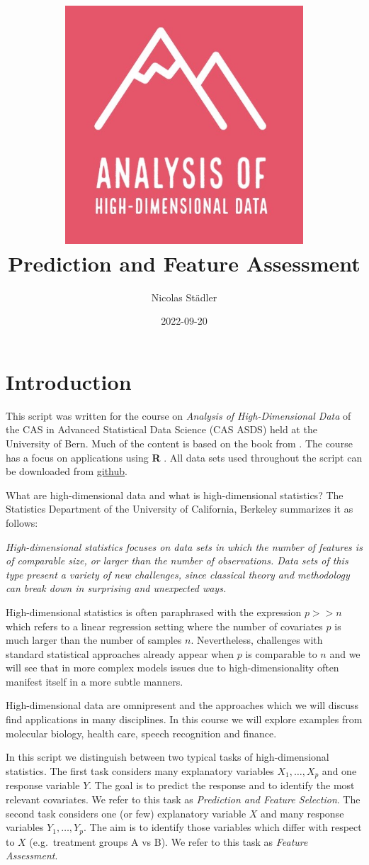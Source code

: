 \documentclass[
]{book}
\title{\includegraphics[width=3.5in,height=\textheight]{logo2.jpg}\\
Prediction and Feature Assessment}
\author{Nicolas Städler}
\date{2022-09-20}
\begin{document}
\maketitle

{
\setcounter{tocdepth}{1}
\tableofcontents
}
\hypertarget{introduction}{%
\chapter{Introduction}\label{introduction}}

This script was written for the course on \emph{Analysis of High-Dimensional Data} of the CAS in Advanced Statistical Data Science (CAS ASDS) held at the University of Bern.
Much of the content is based on the book from \citet{elements}. The course has a focus on applications using \textbf{R} \citep{R-base}. All data sets used throughout the script can be downloaded from \href{https://github.com/staedlern/highdim_stats}{github}.

What are high-dimensional data and what is high-dimensional statistics? The Statistics Department of the University of California, Berkeley summarizes it as follows:

\emph{High-dimensional statistics focuses on data sets in which the number of features is of comparable size, or larger than the number of observations. Data sets of this type present a variety of new challenges, since classical theory and methodology can break down in surprising and unexpected ways.}

High-dimensional statistics is often paraphrased with the expression \(p>>n\) which refers to a linear regression setting where the number of covariates \(p\) is much larger than the number of samples \(n\). Nevertheless, challenges with standard statistical approaches already appear when \(p\) is comparable to \(n\) and we will see that in more complex models issues due to high-dimensionality often manifest itself in a more subtle manners.

High-dimensional data are omnipresent and the approaches which we will discuss find applications in many disciplines. In this course we will explore examples from molecular biology, health care, speech recognition and finance.

In this script we distinguish between two typical tasks of high-dimensional statistics. The first task considers many explanatory variables \(X_1,\ldots,X_p\) and one response variable \(Y\). The goal is to predict the response and to identify the most relevant covariates. We refer to this task as \emph{Prediction and Feature Selection}. The second task considers one (or few) explanatory variable \(X\) and many response variables \(Y_1, \ldots, Y_p\). The aim is to identify those variables which differ with respect to \(X\) (e.g.~treatment groups A vs B). We refer to this task as \emph{Feature Assessment}.
\end{document}
